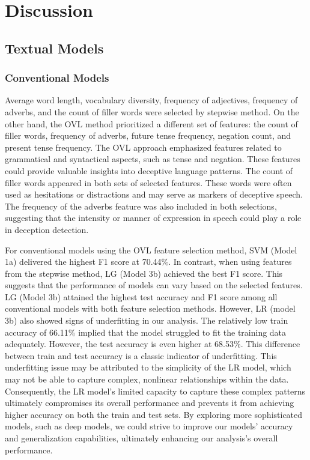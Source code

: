 \documentclass[12pt]{article}
\begin{document}
\section{Discussion}
\subsection{Textual Models}
\subsubsection{Conventional Models}
Average word length, vocabulary diversity, frequency of adjectives, frequency of adverbs, and the count of filler words were selected by stepwise method. On the other hand, the OVL method prioritized a different set of features: the count of filler words, frequency of adverbs, future tense frequency, negation count, and present tense frequency. The OVL approach emphasized features related to grammatical and syntactical aspects, such as tense and negation. These features could provide valuable insights into deceptive language patterns. The count of filler words appeared in both sets of selected features. These words were often used as hesitations or distractions and may serve as markers of deceptive speech. The frequency of the adverbs feature was also included in both selections, suggesting that the intensity or manner of expression in speech could play a role in deception detection.
  
For conventional models using the OVL feature selection method, SVM (Model 1a) delivered the highest F1 score at 70.44$\%$. In contrast, when using features from the stepwise method, LG (Model 3b) achieved the best F1 score. This suggests that the performance of models can vary based on the selected features. LG (Model 3b) attained the highest test accuracy and F1 score among all conventional models with both feature selection methods. However, LR (model 3b) also showed signs of underfitting in our analysis. The relatively low train accuracy of 66.11$\%$ implied that the model struggled to fit the training data adequately. However, the test accuracy is even higher at 68.53$\%$. This difference between train and test accuracy is a classic indicator of underfitting. This underfitting issue may be attributed to the simplicity of the LR model, which may not be able to capture complex, nonlinear relationships within the data. Consequently, the LR model's limited capacity to capture these complex patterns ultimately compromises its overall performance and prevents it from achieving higher accuracy on both the train and test sets. By exploring more sophisticated models, such as deep models, we could strive to improve our models' accuracy and generalization capabilities, ultimately enhancing our analysis's overall performance.
\end{document}

